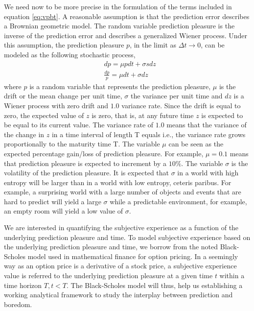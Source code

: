 \documentclass[11pt,twocolumn]{article}
\begin{document}
We need now to be more precise in the formulation of the terms included in equation \ref{eq:vpbt}. A reasonable assumption is that the prediction error describes a Brownian geometric model. 
The random variable prediction pleasure is the inverse of the prediction error and describes a generalized Wiener process. 
Under this assumption, the prediction pleasure $p$, in the limit as $\Delta t \to 0$, can be modeled as the following stochastic process, 
\begin{equation*}
\begin{split}
& dp = \mu p dt + \sigma s dz \\
& \frac{dp}{p}= \mu dt + \sigma dz
\end{split}
\label{eq:wiener}
\end{equation*}
where $p$ is a random variable that represents the prediction pleasure, $\mu$ is the drift or the mean change per unit time, $\sigma$ the variance per unit time and $dz$ is a Wiener process with zero drift and $1.0$ variance rate. Since the drift is equal to zero, the expected value of $z$ is zero, that is, at any future time $z$ is expected to be equal to its current value. The variance rate of $1.0$ means that the variance of the change in $z$ in a
time interval of length T equals i.e., the variance rate grows proportionally to the maturity time T. 
The variable $\mu$ can be seen as the expected percentage gain/loss of prediction pleasure. For example, $\mu = 0.1$ means that prediction pleasure is expected to increment by a $10\%$. The variable $\sigma$ is the volatility of the prediction pleasure. It is expected that $\sigma$ in a world with high entropy will be larger than in a world with low entropy, ceteris paribus. For example, a surprising world with a large number of objects and events that are hard to predict will yield a large $\sigma$ while a predictable environment, for example, an empty room will yield a low value of $\sigma$. 

We are interested in quantifying the subjective experience as a function of the underlying prediction pleasure and time. To model subjective experience based on the underlying prediction pleasure and time, we borrow from the noted Black-Scholes model \citep{black_pricing_1973} used in mathematical finance for option pricing. In a seemingly way as an option price is a derivative of a stock price, a subjective experience value is referred to the underlying prediction pleasure at a given time $t$ within a time horizon $T, t < T$. The Black-Scholes model will thus, help us  establishing a working analytical framework to study the interplay between prediction and boredom.  
\end{document}
